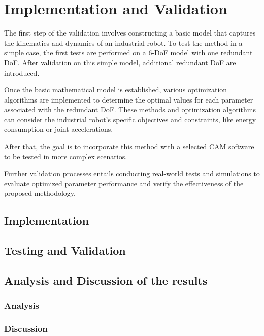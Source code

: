 \chapter{Implementation and Validation}%

The first step of the validation involves constructing a basic model that captures the kinematics and dynamics of an industrial robot. To test the method in a simple case, the first tests are performed on a 6-DoF model with one redundant DoF. After validation on this simple model, additional redundant DoF are introduced. 

Once the basic mathematical model is established, various optimization algorithms are implemented to determine the optimal values for each parameter associated with the redundant DoF. These methods and optimization algorithms can consider the industrial robot's specific objectives and constraints, like energy consumption or joint accelerations. 

After that, the goal is to incorporate this method with a selected CAM software to be tested in more complex scenarios.

Further validation processes entails conducting real-world tests and simulations to evaluate optimized parameter performance and verify the effectiveness of the proposed methodology.
\section{Implementation}%

\section{Testing and Validation}%

\section{Analysis and Discussion of the results}%


\subsection{Analysis}
\subsection{Discussion}%